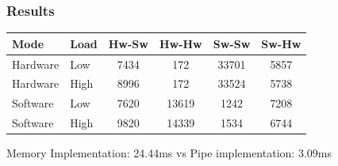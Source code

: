 \subsubsection{Results}
\begin{table}
	\centering
	\label{tab:pipe_turn}
	\begin{tabular}{llcccc}
	\hline
	\textbf{Mode} & \textbf{Load} & \textbf{Hw-Sw} & \textbf{Hw-Hw} & \textbf{Sw-Sw} & \textbf{Sw-Hw}\\
	\hline
	Hardware & Low & 7434 & 172 & 33701 & 5857\\
	Hardware & High & 8996 & 172 & 33524 & 5738\\
	Software & Low & 7620 & 13619 & 1242 & 7208\\
	Software & High & 9820 & 14339 & 1534 & 6744\\
	\hline
	\end{tabular}
\end{table}

Memory Implementation: 24.44ms vs Pipe implementation: 3.09ms